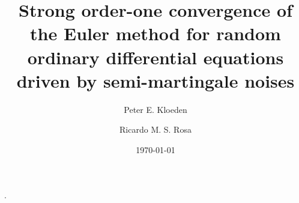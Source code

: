 \documentclass[reqno,12pt]{amsart}
\theoremstyle{plain} %
\theoremstyle{definition} %
\begin{document}


\title[Euler method for Random ODEs with semi-martingales]{Strong order-one convergence of the Euler method for random ordinary differential equations driven by semi-martingale noises}

\author[P. E. Kloeden]{Peter E. Kloeden}
\author[R. M. S. Rosa]{Ricardo M. S. Rosa}

\address[Peter E. Kloeden]{Mathematics Department, University of T\"ubingen, Germany}
\address[Ricardo M. S. Rosa]{Instituto de Matem\'atica, Universidade Federal do Rio de Janeiro, Brazil}


\date{\today}

\makeatletter
{}
\makeatother
{}

.
\end{document}
